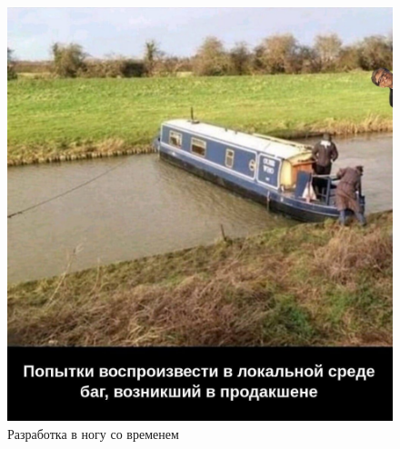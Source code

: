 \documentclass[a4paper, 12pt]{article}
\begin{document}
\lipsum[1-2]
\begin{figure}[h]
  \centering
  \includegraphics[scale=0.20]{image_3}
  \caption{Разработка в ногу со временем}
\end{figure}
\lipsum[1-1]
\end{document}
